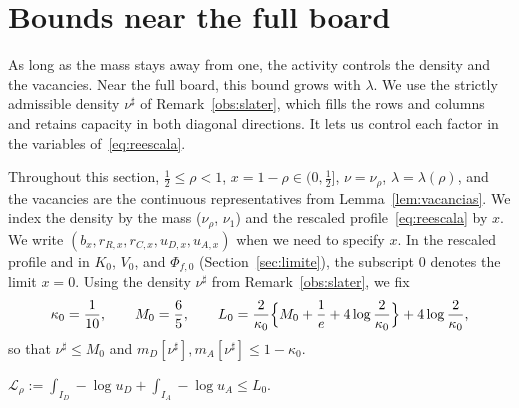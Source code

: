 \section{Bounds near the full board}\label{sec:cotas}

As long as the mass stays away from one, the activity controls the density and the vacancies. Near the full board, this bound grows
with $\lambda$. We use the strictly admissible density $\nu^\sharp$ of Remark~\ref{obs:slater}, which fills the rows and columns and
retains capacity in both diagonal directions. It lets us control each factor in the variables of~\eqref{eq:reescala}.

Throughout this section, $\frac12\le\rho<1$, $x=1-\rho\in(0,\frac12]$, $\nu=\nu_\rho$, $\lambda=\lambda(\rho)$, and the vacancies are
the continuous representatives from Lemma~\ref{lem:vacancias}. We index the density by the mass ($\nu_\rho$, $\nu_1$) and the rescaled
profile~\eqref{eq:reescala} by $x$. We write $(b_x,r_{R,x},r_{C,x},u_{D,x},u_{A,x})$ when we need to specify $x$. In the rescaled
profile and in $K_0$, $V_0$, and $\Phi_{f,0}$ (Section~\ref{sec:limite}), the subscript $0$ denotes the limit $x=0$. Using the density
$\nu^\sharp$ from Remark~\ref{obs:slater}, we fix \[
 \kappa_0=\frac1{10},\qquad M_0=\frac65,\qquad
 L_0=\frac2{\kappa_0}\Bigl\{M_0+\frac1e+4\log\frac2{\kappa_0}\Bigr\}+4\log\frac2{\kappa_0},
\] so that $\nu^\sharp\le M_0$ and $m_D[\nu^\sharp],m_A[\nu^\sharp]\le1-\kappa_0$.

\begin{lema}\label{lem:log_diag} $\displaystyle \mathcal L_\rho:=\int_{I_D}-\log
u_D+\int_{I_A}-\log u_A\le L_0$. \end{lema}

